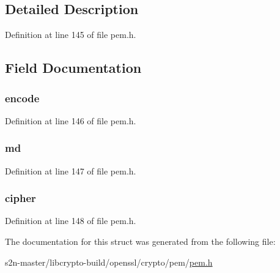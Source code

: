 \subsection{Detailed Description}


Definition at line 145 of file pem.\+h.



\subsection{Field Documentation}
\subsubsection[{\texorpdfstring{encode}{encode}}]{ encode}\hypertarget{struct_p_e_m___encode___seal__st_a1928ce26a645ab3a2a1cde2d9124f761}{}\label{struct_p_e_m___encode___seal__st_a1928ce26a645ab3a2a1cde2d9124f761}


Definition at line 146 of file pem.\+h.

\subsubsection[{\texorpdfstring{md}{md}}]{ md}\hypertarget{struct_p_e_m___encode___seal__st_a3baf08d652f4c55fed4cdd71ddf45b80}{}\label{struct_p_e_m___encode___seal__st_a3baf08d652f4c55fed4cdd71ddf45b80}


Definition at line 147 of file pem.\+h.

\subsubsection[{\texorpdfstring{cipher}{cipher}}]{ cipher}\hypertarget{struct_p_e_m___encode___seal__st_a9c705fb8f37bc72da4bd64cd72068415}{}\label{struct_p_e_m___encode___seal__st_a9c705fb8f37bc72da4bd64cd72068415}


Definition at line 148 of file pem.\+h.



The documentation for this struct was generated from the following file\+:\begin{DoxyCompactItemize}
\item 
s2n-\/master/libcrypto-\/build/openssl/crypto/pem/\hyperlink{crypto_2pem_2pem_8h}{pem.\+h}\end{DoxyCompactItemize}
